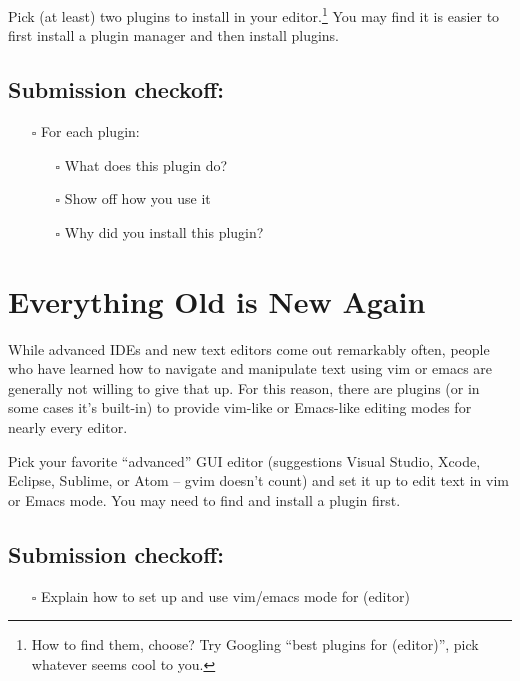 \documentclass{article}
\begin{document}
Pick (at least) two plugins to install in your editor.\footnote{%
  How to find them, choose? Try Googling ``best plugins for (editor)'', pick
  whatever seems cool to you.
} You may find it is easier to first install a plugin manager and then install
plugins.

\subsection*{Submission checkoff:}
\begin{itemize}
  \item[$\square$] For each plugin:
    \begin{itemize}
      \item[$\square$] What does this plugin do?
      \item[$\square$] Show off how you use it
      \item[$\square$] Why did you install this plugin?
    \end{itemize}
\end{itemize}


\section{Everything Old is New Again}

While advanced IDEs and new text editors come out remarkably often, people who
have learned how to navigate and manipulate text using vim or emacs are
generally not willing to give that up.
For this reason, there are plugins (or in some cases it's built-in) to provide
vim-like or Emacs-like editing modes for nearly every editor.

Pick your favorite ``advanced'' GUI editor (suggestions Visual Studio, Xcode,
Eclipse, Sublime, or Atom -- gvim doesn't count) and set it up to edit text in
vim or Emacs mode. You may need to find and install a plugin first.

\subsection*{Submission checkoff:}
\begin{itemize}
  \item[$\square$] Explain how to set up and use vim/emacs mode for (editor)
\end{itemize}
\end{document}
